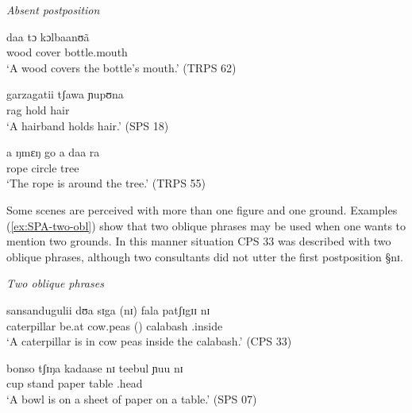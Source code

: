 
\begin{exe}
\ex\label{ex:SPA-abs-postp}{\it Absent postposition}
\begin{xlist}

% 
\ex\label{ex:SPA-TRPS-62}
 \gll daa tɔ kɔlbaanʊã\\
 wood cover bottle.mouth\\
 \glt `A wood covers the bottle's mouth.' (TRPS 62)

\ex\label{ex:SPA-SPS-18}
\gll garzagatii tʃawa ɲupʊna \\
rag hold hair\\
\glt `A hairband holds hair.' (SPS 18)

\ex\label{ex:SPA-SPS-18}
\gll  a ŋmɛŋ go a daa ra  \\
 {\art} rope circle  {\art} tree {\foc}\\
\glt `The rope is around the tree.' (TRPS 55)
\end{xlist}
\end{exe}


Some scenes are perceived with more than  one figure and 
one ground. Examples (\ref{ex:SPA-two-obl}) show that  two oblique phrases may
be used when  one wants to mention two grounds. In this manner situation CPS 33
was described with two oblique phrases, although two consultants did not utter
the
first  postposition {\S nɪ}.


\begin{exe}
\ex\label{ex:SPA-two-obl}{\it Two oblique phrases}
\begin{xlist}

\ex\label{ex:SPA-CPS-33}
 \gll sansandugulii dʊa sɪga (nɪ)  fala patʃɪgɪɪ nɪ\\
caterpillar be.at cow.peas (\postp) calabash  {\reln .inside} {\postp}\\
 \glt `A caterpillar is in cow peas inside the calabash.' (CPS 33)

\ex\label{ex:SPA-SPS-07}
 \gll bonso tʃɪŋa kadaase nɪ teebul ɲuu nɪ \\
 cup stand paper {\postp} table {\reln .head} {\postp}\\
 \glt `A bowl is on a sheet of paper on a table.' (SPS 07)

\end{xlist}
\end{exe}

